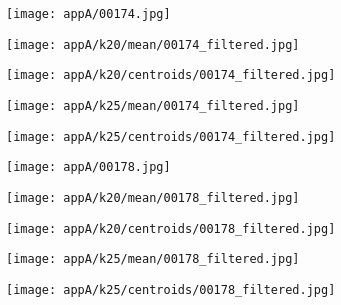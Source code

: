 \documentclass[draft,final]{vutinfth} %
\begin{document}
\begin{appendices}
\begin{figure}[h]
\centering
  \begin{subfigure}[b]{0.19\columnwidth}
    \centering
    \texttt{[image: appA/00174.jpg]}
  \end{subfigure}
  \begin{subfigure}[b]{0.19\columnwidth}
    \centering
    \texttt{[image: appA/k20/mean/00174\_filtered.jpg]}
  \end{subfigure}
  \begin{subfigure}[b]{0.19\columnwidth}
    \centering
    \texttt{[image: appA/k20/centroids/00174\_filtered.jpg]}
  \end{subfigure}
  \begin{subfigure}[b]{0.19\columnwidth}
    \centering
    \texttt{[image: appA/k25/mean/00174\_filtered.jpg]}
  \end{subfigure}
  \begin{subfigure}[b]{0.19\columnwidth}
    \centering
    \texttt{[image: appA/k25/centroids/00174\_filtered.jpg]}
  \end{subfigure}
\caption{}
\end{figure}  

\begin{figure}[h]
\centering
  \begin{subfigure}[b]{0.19\columnwidth}
    \centering
    \texttt{[image: appA/00178.jpg]}
  \end{subfigure}
  \begin{subfigure}[b]{0.19\columnwidth}
    \centering
    \texttt{[image: appA/k20/mean/00178\_filtered.jpg]}
  \end{subfigure}
  \begin{subfigure}[b]{0.19\columnwidth}
    \centering
    \texttt{[image: appA/k20/centroids/00178\_filtered.jpg]}
  \end{subfigure}
  \begin{subfigure}[b]{0.19\columnwidth}
    \centering
    \texttt{[image: appA/k25/mean/00178\_filtered.jpg]}
  \end{subfigure}
  \begin{subfigure}[b]{0.19\columnwidth}
    \centering
    \texttt{[image: appA/k25/centroids/00178\_filtered.jpg]}
  \end{subfigure}
\caption{}
\end{figure}  


\end{appendices}
\end{document}
